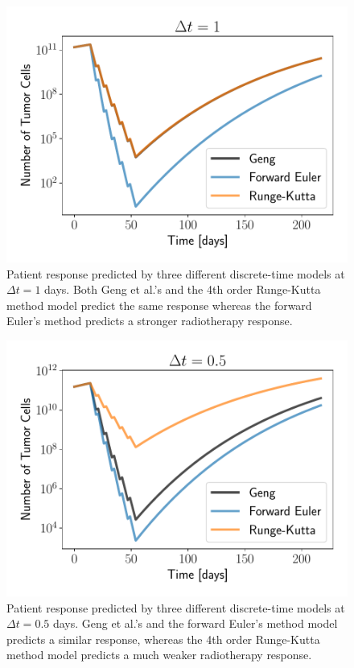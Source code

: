 \documentclass[letterpaper
, superscriptaddress
, twocolumn
, aps
]{revtex4}
\begin{document}
\begin{figure}
	\includegraphics[width=1.00\columnwidth]{Figures/responsedt1.pdf}
	\caption{Patient response predicted by three different discrete-time models at $\Delta t = 1$ days. Both Geng et al.'s and the 4th order Runge-Kutta method model predict the same response whereas the forward Euler's method predicts a stronger radiotherapy response.}
	\label{rt1}
\end{figure}
\begin{figure}
	\includegraphics[width=1.00\columnwidth]{Figures/responsedt05.pdf}
	\caption{Patient response predicted by three different discrete-time models at $\Delta t = 0.5$ days. Geng et al.'s and the forward Euler's method model predicts a similar response, whereas the 4th order Runge-Kutta method model predicts a much weaker radiotherapy response.}
	\label{rt05}
\end{figure}
\end{document}
